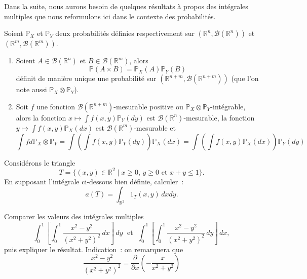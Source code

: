 Dans la suite, nous aurons besoin de quelques résultats à propos des
intégrales multiples que nous reformulons ici dans le contexte des
probabilités.

\begin{theoreme}\label{II-fubiniproba}

Soient \(\mathbb{P}_X\) et \(\mathbb{P}_Y\) deux probabilités définies
respectivement sur \((\mathbb{R}^n, \mathcal{B}(\mathbb{R}^n))\) et
\((\mathbb{R}^m, \mathcal{B}(\mathbb{R}^m))\).

\begin{enumerate}
\def\labelenumi{\arabic{enumi}.}
\tightlist
\item
  Soient \(A \in \mathcal{B}(\mathbb{R}^n)\) et
  \(B \in \mathcal{B}(\mathbb{R}^m)\), alors
  \[\mathbb{P}(A \times B) = \mathbb{P}_X(A)\mathbb{P}_Y(B)\] définit de
  manière unique une probabilité sur
  \((\mathbb{R}^{n+m}, \mathcal{B}(\mathbb{R}^{n+m}))\) (que l'on note
  aussi \(\mathbb{P}_X \otimes \mathbb{P}_Y\)).
\item
  Soit \(f\) une fonction \(\mathcal{B}(\mathbb{R}^{n+m})\)-mesurable
  positive ou \(\mathbb{P}_X \otimes \mathbb{P}_Y\)-intégrable, alors la
  fonction \(x \mapsto \int f(x, y)\mathbb{P}_Y(dy)\) est
  \(\mathcal{B}(\mathbb{R}^{n})\)-mesurable, la fonction
  \(y \mapsto \int f (x, y) \mathbb{P}_X(dx)\) est
  \(\mathcal{B}(\mathbb{R}^m)\)-mesurable et
  \[\int f d\mathbb{P}_X\otimes\mathbb{P}_Y = \int \left(\int f(x,y) \mathbb{P}_Y(dy) \right) \mathbb{P}_X(dx) = \int \left(\int f(x,y) \mathbb{P}_X(dx) \right) \mathbb{P}_Y(dy)\]
\end{enumerate}
\end{theoreme}

\label{II-triangle}
Considérons le triangle \[
T = \{(x, y) \in \mathbb{R}^2 \; | \; x \geq 0, \, y \geq 0 \mbox{ et } x + y \leq  1\}.
\] En supposant l'intégrale ci-dessous bien définie, calculer~: \[
a(T) = \int_{\mathbb{R}^2} 1_T(x, y) \, dxdy.
\]


\label{II-fubini-counter-example}
Comparer les valeurs des intégrales multiples \[
\int_0^1 \left[\int_0^1 \frac{x^2 - y^2}{(x^2+y^2)^2} \, dx \right] \, dy
\; \mbox{ et } \;
\int_0^1 \left[\int_0^1 \frac{x^2 - y^2}{(x^2+y^2)^2} \, dy \right] \, dx,
\] puis expliquer le résultat. Indication~: on remarquera que \[
\frac{x^2 - y^2}{(x^2+y^2)^2} = \frac{\partial}{\partial x} \left(-\frac{x}{x^2+y^2}\right) 
\] 

